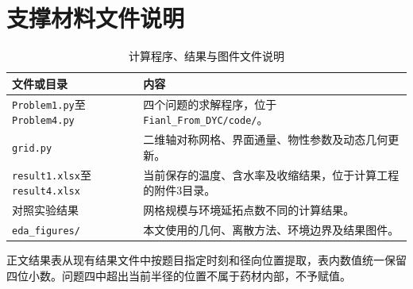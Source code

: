 \section{支撑材料文件说明}
\begin{table}[!htbp]\centering\small
\caption{计算程序、结果与图件文件说明}\label{tab:support}
\begin{tabularx}{\linewidth}{@{}lL@{}}\toprule
文件或目录 & 内容\\\midrule
\texttt{Problem1.py}至\texttt{Problem4.py} & 四个问题的求解程序，位于\texttt{Fianl\_From\_DYC/code/}。\\
\texttt{grid.py} & 二维轴对称网格、界面通量、物性参数及动态几何更新。\\
\texttt{result1.xlsx}至\texttt{result4.xlsx} & 当前保存的温度、含水率及收缩结果，位于计算工程的附件3目录。\\
对照实验结果 & 网格规模与环境延拓点数不同的计算结果。\\
\texttt{eda\_figures/} & 本文使用的几何、离散方法、环境边界及结果图件。\\
\bottomrule\end{tabularx}
\end{table}
正文结果表从现有结果文件中按题目指定时刻和径向位置提取，表内数值统一保留四位小数。问题四中超出当前半径的位置不属于药材内部，不予赋值。
